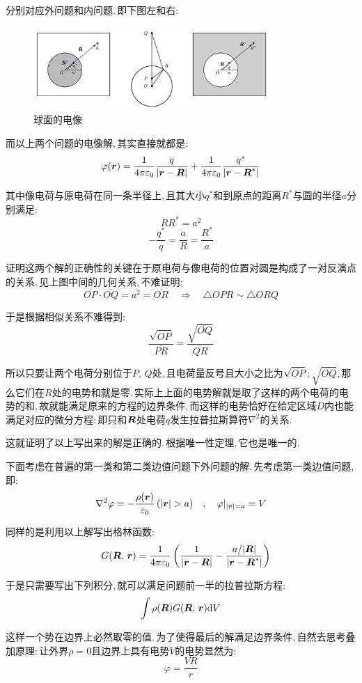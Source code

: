 分别对应外问题和内问题.\,即下图左和右:
\begin{figure}[H]
\centering
\includegraphics[width=0.8\textwidth]{image/7-2-10.png}
\caption{球面的电像}
\end{figure}

而以上两个问题的电像解,\,其实直接就都是:
\[\varphi(\boldsymbol{r}) =\frac{1}{4\pi\varepsilon_0} \frac{q}{|\boldsymbol{r}-\boldsymbol{R}|}+\frac{1}{4\pi\varepsilon_0} \frac{q^\ast}{|\boldsymbol{r}-\boldsymbol{R}^\ast|}\]

其中像电荷与原电荷在同一条半径上,\,且其大小$q^\ast$和到原点的距离$R^\ast$与圆的半径$a$分别满足:
\[RR^\ast=a^2\]
\[-\frac{q^\ast}{q}=\frac{a}{R}=\frac{R^\ast}{a}\]

证明这两个解的正确性的关键在于原电荷与像电荷的位置对圆是构成了一对反演点的关系.\,见上图中间的几何关系,\,不难证明:
\[\overline{OP}\cdot\overline{OQ}=a^2=\overline{OR}\quad \Rightarrow \quad \triangle OPR\sim \triangle ORQ\]

于是根据相似关系不难得到:
\[\frac{\sqrt{\overline{OP}}}{\overline{PR}}=\frac{\sqrt{\overline{OQ}}}{\overline{QR}}\]

所以只要让两个电荷分别位于$P,\,Q$处,\,且电荷量反号且大小之比为$\sqrt{\overline{OP}}:\sqrt{\overline{OQ}}$,\,那么它们在$R$处的电势和就是零.\,实际上上面的电势解就是取了这样的两个电荷的电势的和,\,故就能满足原来的方程的边界条件,\,而这样的电势恰好在给定区域$D$内也能满足对应的微分方程:\,即只和$\boldsymbol{R}$处电荷$q$发生拉普拉斯算符$\nabla^2$的关系.

这就证明了以上写出来的解是正确的.\,根据唯一性定理,\,它也是唯一的.

\vspace{0.5cm}
下面考虑在普遍的第一类和第二类边值问题下外问题的解.\,先考虑第一类边值问题,\,即:
\[\nabla^2\varphi = -\frac{\rho(\bs{r})}{\varepsilon_0}\,(|\bs{r}|>a)\quad ,\quad \varphi|_{|\bs{r}|=a}=V\]

同样的是利用以上解写出格林函数:
\[\quad G(\boldsymbol{R},\,\boldsymbol{r})=\frac{1}{4\pi\varepsilon_0} \left(\frac{1}{|\boldsymbol{r}-\boldsymbol{R}|}-\frac{a/|\boldsymbol{R}|}{|\boldsymbol{r}-\boldsymbol{R}^\ast|}\right)\]

于是只需要写出下列积分,\,就可以满足问题前一半的拉普拉斯方程:
\[\int \rho(\boldsymbol{R})G(\boldsymbol{R},\,\boldsymbol{r})\textrm{d} V \]

这样一个势在边界上必然取零的值.\,为了使得最后的解满足边界条件,\,自然去思考叠加原理:\,让外界$\rho=0$且边界上具有电势$V$的电势显然为:
\[\varphi=\frac{VR}{r}\]


